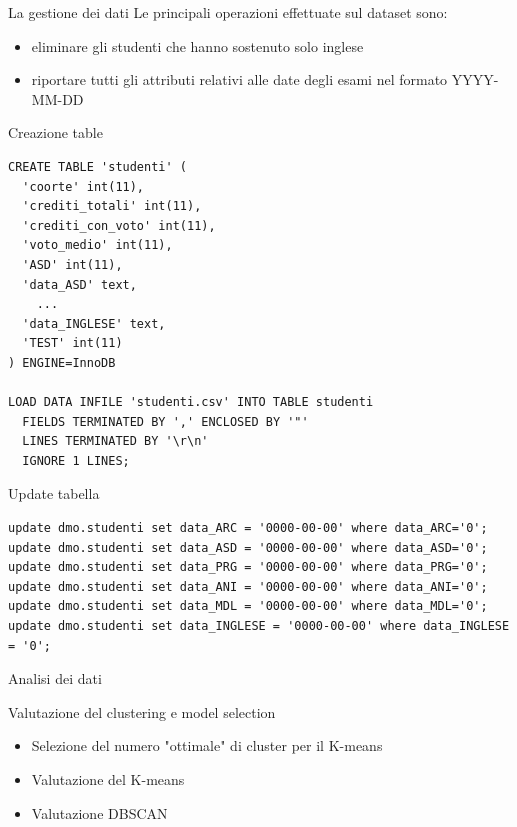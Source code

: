 \documentclass{beamer}
\begin{document}
    \begin{frame}{La gestione dei dati}
        Le principali operazioni effettuate sul dataset sono:
        \begin{itemize}
            \item eliminare gli studenti che hanno sostenuto solo inglese
            \item riportare tutti gli attributi relativi alle date degli esami nel formato YYYY-MM-DD
        \end{itemize}
    \end{frame}

    \begin{frame}[fragile]{Creazione table}
        \begin{lstlisting}[style=sql]
CREATE TABLE 'studenti' (
  'coorte' int(11),
  'crediti_totali' int(11),
  'crediti_con_voto' int(11),
  'voto_medio' int(11),
  'ASD' int(11),
  'data_ASD' text,
    ...
  'data_INGLESE' text,
  'TEST' int(11)
) ENGINE=InnoDB

LOAD DATA INFILE 'studenti.csv' INTO TABLE studenti
  FIELDS TERMINATED BY ',' ENCLOSED BY '"'
  LINES TERMINATED BY '\r\n'
  IGNORE 1 LINES; 
        \end{lstlisting}
    \end{frame}

\begin{frame}[fragile]{Update tabella}
\begin{lstlisting}[style=sql]
update dmo.studenti set data_ARC = '0000-00-00' where data_ARC='0'; 
update dmo.studenti set data_ASD = '0000-00-00' where data_ASD='0'; 
update dmo.studenti set data_PRG = '0000-00-00' where data_PRG='0'; 
update dmo.studenti set data_ANI = '0000-00-00' where data_ANI='0'; 
update dmo.studenti set data_MDL = '0000-00-00' where data_MDL='0';
update dmo.studenti set data_INGLESE = '0000-00-00' where data_INGLESE = '0';
\end{lstlisting}
\end{frame}

\begin{frame}{Analisi dei dati}

\end{frame}

\begin{frame}{Valutazione del clustering e model selection} 
    \begin{itemize}
      \item Selezione del numero "ottimale" di cluster per il K-means
      \item Valutazione del K-means
      \item Valutazione DBSCAN
    \end{itemize} 
\end{frame}
\end{document}
